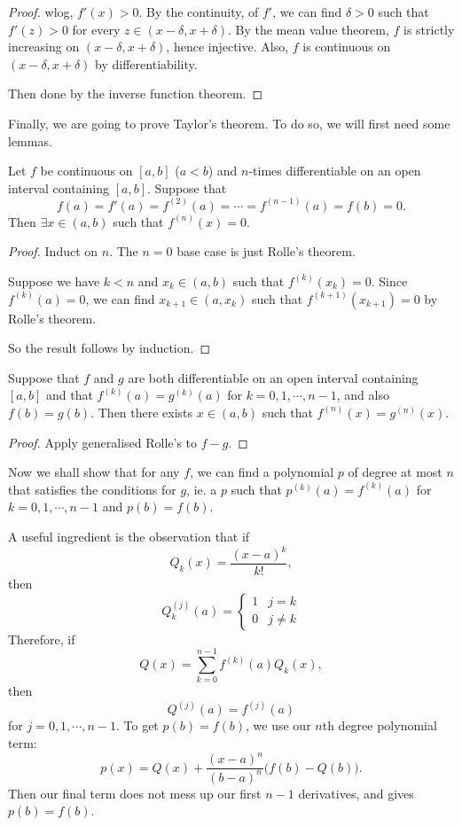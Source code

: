 \documentclass[a4paper]{article}
\begin{document}
\begin{proof}
  wlog, $f'(x) > 0$. By the continuity, of $f'$, we can find $\delta > 0$ such that $f'(z) > 0$ for every $z\in (x - \delta, x + \delta)$. By the mean value theorem, $f$ is strictly increasing on $(x - \delta, x + \delta)$, hence injective. Also, $f$ is continuous on $(x - \delta, x + \delta)$ by differentiability.

  Then done by the inverse function theorem.
\end{proof}

Finally, we are going to prove Taylor's theorem. To do so, we will first need some lemmas.
\begin{thm}
  Let $f$ be continuous on $[a, b]$ ($a < b$) and $n$-times differentiable on an open interval containing $[a, b]$. Suppose that
  \[
    f(a) = f'(a) = f^{(2)}(a) = \cdots = f^{(n - 1)}(a) = f(b) = 0.
  \]
  Then $\exists x\in (a, b)$ such that $f^{(n)}(x) = 0$.
\end{thm}

\begin{proof}
  Induct on $n$. The $n = 0$ base case is just Rolle's theorem.

  Suppose we have $k < n$ and $x_k\in (a, b)$ such that $f^{(k)}(x_k) = 0$. Since $f^{(k)}(a) = 0$, we can find $x_{k + 1}\in (a, x_k)$ such that $f^{(k + 1)}(x_{k + 1}) = 0$ by Rolle's theorem.

  So the result follows by induction.
\end{proof}

\begin{cor}
  Suppose that $f$ and $g$ are both differentiable on an open interval containing $[a, b]$ and that $f^{(k)}(a) = g^{(k)}(a)$ for $k = 0, 1, \cdots, n - 1$, and also $f(b) = g(b)$. Then there exists $x\in (a, b)$ such that $f^{(n)}(x) = g^{(n)}(x)$.
\end{cor}

\begin{proof}
  Apply generalised Rolle's to $f - g$.
\end{proof}

Now we shall show that for any $f$, we can find a polynomial $p$ of degree at most $n$ that satisfies the conditions for $g$, ie. a $p$ such that $p^{(k)}(a) = f^{(k)}(a)$ for $k = 0, 1, \cdots, n - 1$ and $p(b) = f(b)$.

A useful ingredient is the observation that if
\[
  Q_k(x) = \frac{(x - a)^k}{k!},
\]
then
\[
  Q_k^{(j)}(a) =
  \begin{cases}
    1 & j = k\\
    0 & j \not= k
  \end{cases}
\]
Therefore, if
\[
  Q(x) = \sum_{k = 0}^{n - 1}f^{(k)}(a) Q_k(x),
\]
then
\[
  Q^{(j)}(a) = f^{(j)}(a)
\]
for $j = 0, 1, \cdots, n - 1$. To get $p(b) = f(b)$, we use our $n$th degree polynomial term:
\[
  p(x) = Q(x) + \frac{(x - a)^n}{(b - a)^n}\big(f(b) - Q(b)\big).
\]
Then our final term does not mess up our first $n - 1$ derivatives, and gives $p(b)= f(b)$.
\end{document}
